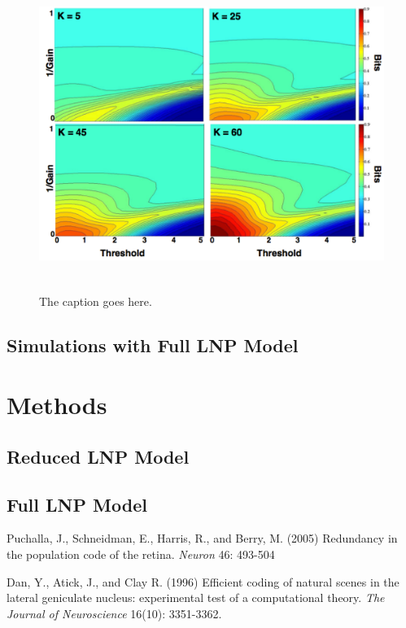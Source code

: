 \documentclass[12pt]{article}
\begin{document}
\begin{figure}[h!!]
\centerline{\includegraphics*[height = 4.0in,width=5.0in,angle=0]{InfoPeakFR.pdf}}
\label{Figure 3}
\caption{The caption goes here. }
\end{figure}

\subsection{Simulations with Full LNP Model}

\section{Methods}

\subsection{Reduced LNP Model}

\subsection{Full LNP Model}



\newpage
\begin{thebibliography}{9}

 Puchalla, J., Schneidman, E., Harris, R., and Berry, M. (2005) Redundancy in the population code of the retina. \textit{Neuron} 46: 493-504

 Dan, Y., Atick, J., and Clay R. (1996) Efficient coding of natural scenes in the lateral geniculate nucleus: experimental test of a computational theory. \textit{The Journal of Neuroscience} 16(10): 3351-3362.


\end{thebibliography}
\end{document}
